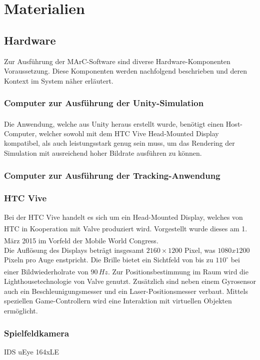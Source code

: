 \section{Materialien}
\subsection{Hardware}
Zur Ausführung der MArC-Software sind diverse Hardware-Komponenten Voraussetzung. Diese Komponenten werden nachfolgend beschrieben und deren Kontext im System näher erläutert.
\subsubsection{Computer zur Ausführung der Unity-Simulation}
Die Anwendung, welche aus Unity\textsuperscript{\cite{website:Unity}} heraus erstellt wurde, benötigt einen Host-Computer, welcher sowohl mit dem HTC Vive Head-Mounted Display kompatibel, als auch leistungsstark genug sein muss, um das Rendering der Simulation mit ausreichend hoher Bildrate ausführen zu können.

\subsubsection{Computer zur Ausführung der Tracking-Anwendung}
\subsubsection{HTC Vive} 
Bei der HTC Vive handelt es sich um ein Head-Mounted Display, welches von HTC in Kooperation mit Valve\textsuperscript{\cite{website:Valve}} produziert wird. Vorgestellt wurde dieses am 1. März 2015 im Vorfeld der Mobile World Congress\textsuperscript{\cite{website:mobileworldcongress}}.\\
Die Auflösung des Displays beträgt insgesamt $2160\times1200$ Pixel, was $1080x1200$ Pixeln pro Auge enstpricht. Die Brille bietet ein Sichtfeld von bis zu $110^\circ$ bei einer Bildwiederholrate von $90\,Hz$\textsuperscript{\cite{website:HTC_Vive}}. Zur Positionsbestimmung im Raum wird die Lighthousetechnologie von Valve genutzt. Zusätzlich sind neben einem Gyrosensor auch ein Beschleunigungsmesser und ein Laser-Positionsmesser verbaut. Mittels speziellen Game-Controllern wird eine Interaktion mit virtuellen Objekten ermöglicht.

\subsubsection{Spielfeldkamera} 
IDS uEye 164xLE

